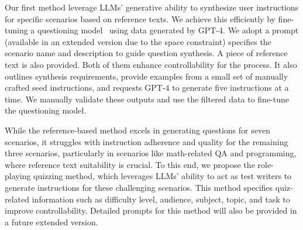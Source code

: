  Our first method leverage LLMs' generative ability to synthesize user instructions for specific scenarios based on reference texts. We achieve this efficiently by fine-tuning a questioning model~\cite{yang2023regGPT} using data generated by GPT-4.  %
We adopt a prompt (available in an extended version due to the space constraint) specifies the scenario name and description to guide question synthesis. A piece of reference text is also provided. Both of them enhance controllability for the process. It also outlines synthesis requirements, provide examples from a small set of manually crafted seed instructions, and requests GPT-4 to generate five instructions at a time. %
We manually validate these outputs and use the filtered data to fine-tune the questioning model.







 While the reference-based method excels in generating questions for seven scenarios, it struggles with instruction adherence and quality for the remaining three scenarios, particularly in scenarios like math-related QA and programming, where reference text suitability is crucial.
To this end, we propose the role-playing quizzing method, which leverages LLMs’ ability to act as test writers to generate instructions for these challenging scenarios. This method specifies quiz-related information such as difficulty level, audience, subject, topic, and task to improve controllability. Detailed prompts for this method will also be provided in a future extended version. 


